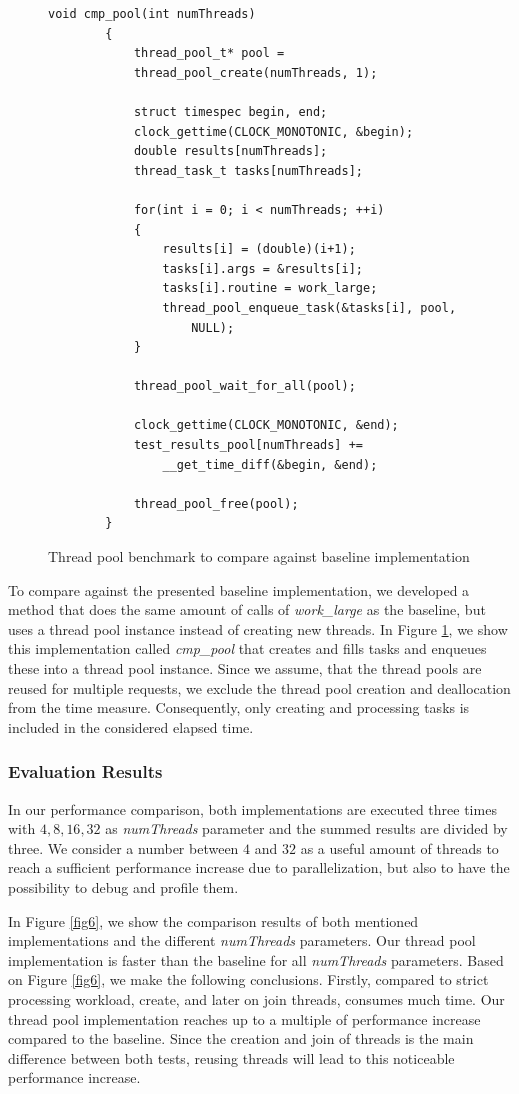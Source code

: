 \documentclass[conference]{IEEEtran}
\begin{document}
\begin{figure}
	\begin{lstlisting}[style=CStyle]
		void cmp_pool(int numThreads)
		{
			thread_pool_t* pool = 
			thread_pool_create(numThreads, 1);
			
			struct timespec begin, end;
			clock_gettime(CLOCK_MONOTONIC, &begin);
			double results[numThreads];
			thread_task_t tasks[numThreads];
			
			for(int i = 0; i < numThreads; ++i)
			{
				results[i] = (double)(i+1);
				tasks[i].args = &results[i];
				tasks[i].routine = work_large;
				thread_pool_enqueue_task(&tasks[i], pool, 
					NULL);
			}
			
			thread_pool_wait_for_all(pool);
			
			clock_gettime(CLOCK_MONOTONIC, &end);
			test_results_pool[numThreads] += 
				__get_time_diff(&begin, &end);
			
			thread_pool_free(pool);
		}
	\end{lstlisting}
	\caption{Thread pool benchmark to compare against baseline implementation}
	\label{fig5}
\end{figure}

To compare against the presented baseline implementation, we developed a method that does the same amount of calls of \emph{work\_large} as the baseline, but uses a thread pool instance instead of creating new threads. In Figure \ref{fig5}, we show this implementation called \emph{cmp\_pool} that creates and fills tasks and enqueues these into a thread pool instance. Since we assume, that the thread pools are reused for multiple requests, we exclude the thread pool creation and deallocation from the time measure. Consequently, only creating and processing tasks is included in the considered elapsed time. 


\subsubsection{Evaluation Results}
In our performance comparison, both implementations are executed three times with $4, 8, 16, 32$ as \emph{numThreads} parameter and the summed results are divided by three. We consider a number between $4$ and $32$ as a useful amount of threads to reach a sufficient performance increase due to parallelization, but also to have the possibility to debug and profile them. 

In Figure \ref{fig6}, we show the comparison results of both mentioned implementations and the different \emph{numThreads} parameters. Our thread pool implementation is faster than the baseline for all \emph{numThreads} parameters. Based on Figure \ref{fig6}, we make the following conclusions.  
Firstly, compared to strict processing workload, create, and later on join threads, consumes much time. Our thread pool implementation reaches up to a multiple of performance increase compared to the baseline. Since the creation and join of threads is the main difference between both tests, reusing threads will lead to this noticeable performance increase. 
\end{document}
